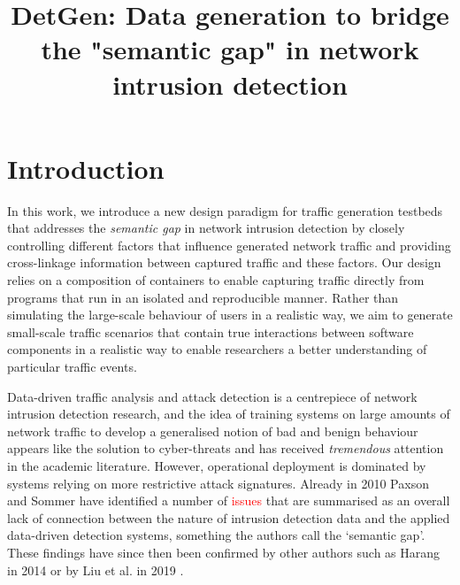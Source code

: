 \documentclass[sigconf]{acmart}
\begin{document}
\title{DetGen: Data generation to bridge the "semantic gap" in network intrusion detection}

\maketitle







\section{Introduction}



In this work, we introduce a new design paradigm for traffic generation testbeds that addresses the \textit{semantic gap} in network intrusion detection by closely controlling different factors that influence generated network traffic and providing cross-linkage information between captured traffic and these factors. Our design relies on a composition of containers to enable capturing traffic directly from programs that run in an isolated and reproducible manner. Rather than simulating the large-scale behaviour of users in a realistic way, we aim to generate small-scale traffic scenarios that contain true interactions between software components in a realistic way to enable researchers a better understanding of particular traffic events. 

Data-driven traffic analysis and attack detection is a centrepiece of network intrusion detection research, and the idea of training systems on large amounts of network traffic to develop a generalised notion of bad and benign behaviour appears  like the solution to cyber-threats and has received \textit{tremendous} attention in the academic literature. However, operational deployment is dominated by systems relying on more restrictive attack signatures. Already in 2010 Paxson and Sommer \cite{sommer2010outside} have identified a number of \textcolor{red}{issues} that are summarised as an overall lack of connection between the nature of intrusion detection data and the applied data-driven detection systems, something the authors call the `semantic gap'. These findings have since then been confirmed by other authors such as Harang \cite{harang2014bridging} in 2014 or by Liu et al. in 2019 \cite{liu2019machine}.
\end{document}
